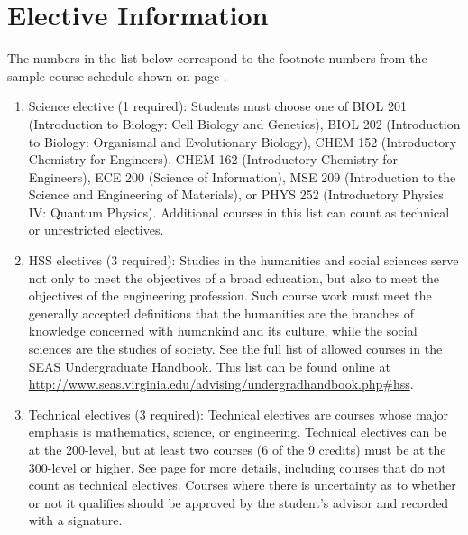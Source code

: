 \documentclass[12pt,twoside]{article}
\newcommand{\textsize}{\Large}
\newcommand{\textsize}{\normalsize}
\begin{document}


\section{Elective Information}
\label{electiveinformation}
\textsize

The numbers in the list below correspond to the footnote numbers from
the sample course schedule shown on page \pageref{sampleschedule}.

\begin{enumerate}

\item Science elective (1 required): Students must choose one of BIOL
201 (Introduction to Biology: Cell Biology and Genetics), BIOL 202
(Introduction to Biology: Organismal and Evolutionary Biology), CHEM
152 (Introductory Chemistry for Engineers), CHEM 162 (Introductory
Chemistry for Engineers), ECE 200 (Science of Information), MSE 209
(Introduction to the Science and Engineering of Materials), or PHYS
252 (Introductory Physics IV: Quantum Physics).  Additional courses in
this list can count as technical or unrestricted electives.

\item HSS electives (3 required): Studies in the humanities and social
sciences serve not only to meet the objectives of a broad education,
but also to meet the objectives of the engineering profession.  Such
course work must meet the generally accepted definitions that the
humanities are the branches of knowledge concerned with humankind and
its culture, while the social sciences are the studies of society.
See the full list of allowed courses in the SEAS Undergraduate
Handbook.  This list can be found online at
\url{http://www.seas.virginia.edu/advising/undergradhandbook.php#hss}.

\item Technical electives (3 required): Technical electives are
courses whose major emphasis is mathematics, science, or
engineering.  Technical electives can be at the 200-level, but at
least two courses (6 of the 9 credits) must be at the 300-level or
higher.  See page \pageref{techelectives} for more details,
including courses that do not count as technical electives.  Courses
where there is uncertainty as to whether or not it qualifies
should be approved by the student's advisor and recorded with a
signature.


\end{enumerate}
\end{document}

